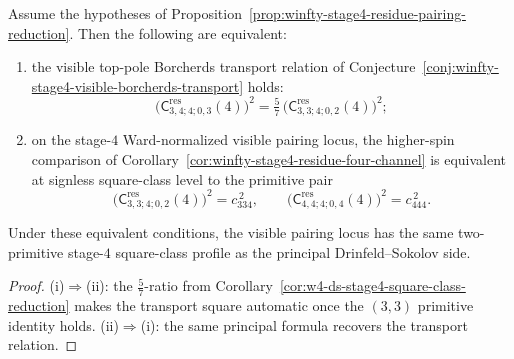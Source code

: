 \begin{corollary}
\label{cor:winfty-stage4-visible-borcherds-two-primitive}
Assume the hypotheses of
Proposition~\ref{prop:winfty-stage4-residue-pairing-reduction}.  Then
the following are equivalent:
\begin{enumerate}[label=\textup{(\roman*)}]
\item the visible top-pole Borcherds transport relation of
  Conjecture~\ref{conj:winfty-stage4-visible-borcherds-transport}
  holds:
  \[
  \bigl(\mathsf{C}^{\mathrm{res}}_{3,4;4;0,3}(4)\bigr)^2
  =
  \tfrac{5}{7}\,
  \bigl(\mathsf{C}^{\mathrm{res}}_{3,3;4;0,2}(4)\bigr)^2;
  \]
\item on the stage-$4$ Ward-normalized visible pairing locus, the
  higher-spin comparison of
  Corollary~\ref{cor:winfty-stage4-residue-four-channel} is equivalent
  at signless square-class level to the primitive pair
  \[
  \bigl(\mathsf{C}^{\mathrm{res}}_{3,3;4;0,2}(4)\bigr)^2
  =
  c_{334}^{\,2},
  \qquad
  \bigl(\mathsf{C}^{\mathrm{res}}_{4,4;4;0,4}(4)\bigr)^2
  =
  c_{444}^{\,2}.
  \]
\end{enumerate}
Under these equivalent conditions, the visible pairing locus has the
same two-primitive stage-$4$ square-class profile as the principal
Drinfeld--Sokolov side.
\end{corollary}

\begin{proof}
\textup{(i)}$\Rightarrow$\textup{(ii)}: the $\tfrac{5}{7}$-ratio from Corollary~\ref{cor:w4-ds-stage4-square-class-reduction} makes the transport square automatic once the $(3,3)$ primitive identity holds.  \textup{(ii)}$\Rightarrow$\textup{(i)}: the same principal formula recovers the transport relation.
\end{proof}

